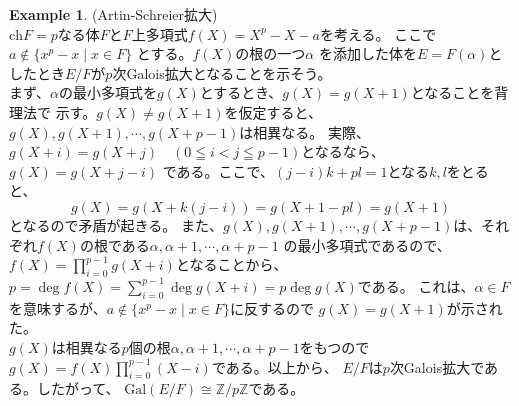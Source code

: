 \documentclass{ltjsarticle}
\theoremstyle{definition}
\newtheorem{example}[definition]{Example}
\begin{document}
\begin{example}\label{xe2}(Artin-Schreier拡大)\\
 $\mathrm{ch}F=p$なる体$F$と$F$上多項式$f(X)=X^p -X-a$を考える。
 ここで$a\notin\{x^p-x\mid x\in F\}$ とする。$f(X)$の根の一つ$\alpha$
 を添加した体を$E=F(\alpha)$としたとき$E/F$が$p$次Galois拡大となることを示そう。\\
 まず、$\alpha$の最小多項式を$g(X)$とするとき、$g(X)=g(X+1)$となることを背理法で
 示す。$g(X)\ne g(X+1)$を仮定すると、$g(X),g(X+1),\cdots ,g(X+p-1)$は相異なる。
 実際、$g(X+i)=g(X+j)\quad (0\leqq i<j\leqq p-1)$となるなら、$g(X)=g(X+j-i)$
 である。ここで、$(j-i)k+pl=1$となる$k,l$をとると、
 \[g(X)=g(X+k(j-i))=g(X+1-pl)=g(X+1)\]
  となるので矛盾が起きる。
  また、$g(X),g(X+1),\cdots ,g(X+p-1)$は、それぞれ$f(X)$の根である$\alpha,\alpha +1,\cdots ,\alpha +p-1$
  の最小多項式であるので、$f(X)=\prod _{i=0}^{p-1}g(X+i)$となることから、
  $p=\deg f(X)=\sum _{i=0}^{p-1}\deg g(X+i)=p\deg g(X)$である。
  これは、$\alpha\in F$を意味するが、$a\notin\{x^p-x\mid x\in F\}$に反するので
  $g(X)=g(X+1)$が示された。\\
  $g(X)$は相異なる$p$個の根$\alpha ,\alpha+1,\cdots ,\alpha +p-1$をもつので
  $g(X)=f(X)\prod _{i=0}^{p-1}(X-i)$である。以上から、
  $E/F$は$p$次Galois拡大である。したがって、
  $\mathrm{Gal}(E/F)\cong \mathbb{Z}/p\mathbb{Z}$である。
\end{example}
\newpage
\end{document}
